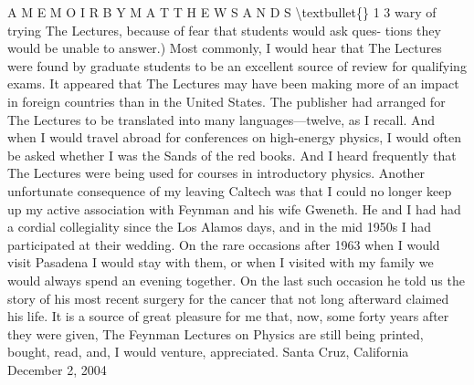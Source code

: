 \documentclass[10pt,oneside]{article}
\begin{document}
A  M E M O I R  B Y  M A T T H E W  S A N D S \textbackslash{}textbullet\{\} 1 3 wary of trying The Lectures, because of fear that students would ask ques- tions they would be unable to answer.) Most commonly, I would hear that The Lectures were found by graduate students to be an excellent source of review for qualifying exams. It appeared that The Lectures may have been making more of an impact in foreign countries than in the United States. The publisher had arranged for The Lectures to be translated into many languages---twelve, as I recall. And when I would travel abroad for conferences on high-energy physics, I would often be asked whether I was the Sands of the red books. And I heard frequently that The Lectures were being used for courses in introductory physics. Another unfortunate consequence of my leaving Caltech was that I could no longer keep up my active association with Feynman and his wife Gweneth. He and I had had a cordial collegiality since the Los Alamos days, and in the mid 1950s I had participated at their wedding. On the rare occasions after 1963 when I would visit Pasadena I would stay with them, or when I visited with my family we would always spend an evening together. On the last such occasion he told us the story of his most recent surgery for the cancer that not long afterward claimed his life. It is a source of great pleasure for me that, now, some forty years after they were given, The Feynman Lectures on Physics are still being printed, bought, read, and, I would venture, appreciated. Santa Cruz, California December 2, 2004\par

\clearpage
{}
\end{document}
